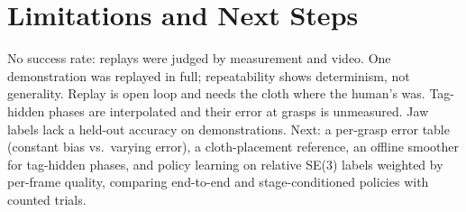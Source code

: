 \documentclass[conference,10pt]{IEEEtran}
\begin{document}
\section{Limitations and Next Steps}
No success rate: replays were judged by measurement and video. One demonstration was replayed in full; repeatability
shows determinism, not generality. Replay is open loop and needs the cloth where the human's was. Tag-hidden phases are
interpolated and their error at grasps is unmeasured. Jaw labels lack a held-out accuracy on demonstrations. Next: a
per-grasp error table (constant bias vs.\ varying error), a cloth-placement reference, an offline smoother for
tag-hidden phases, and policy learning on relative SE(3) labels weighted by per-frame quality, comparing end-to-end and
stage-conditioned policies with counted trials.
\end{document}
